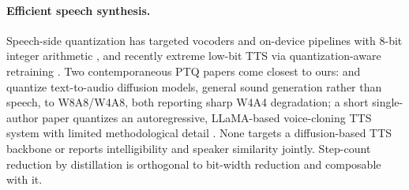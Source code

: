\paragraph{Efficient speech synthesis.}
Speech-side quantization has targeted vocoders and on-device pipelines with 8-bit integer arithmetic \citep{valin2022shoestring,vipperla2020bunched}, and recently extreme low-bit TTS via quantization-aware retraining \citep{kawamura2025bittts}. Two contemporaneous PTQ papers come closest to ours: \citet{khandelwal2025ptqaudio} and \citet{vora2025ptq4adm} quantize text-to-audio diffusion models, general sound generation rather than speech, to W8A8/W4A8, both reporting sharp W4A4 degradation; a short single-author paper quantizes an autoregressive, LLaMA-based voice-cloning TTS system with limited methodological detail \citep{zain2026lightweight}. None targets a diffusion-based TTS backbone or reports intelligibility and speaker similarity jointly. Step-count reduction by distillation \citep{yin2024dmd,yin2024dmd2,li2025dmospeech} is orthogonal to bit-width reduction and composable with it.
